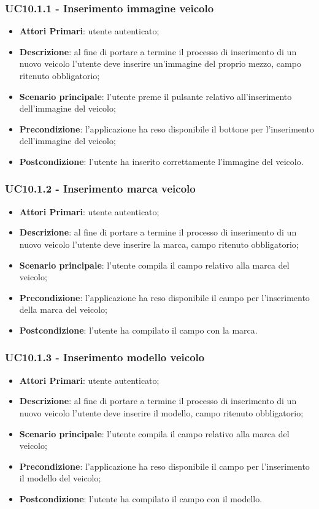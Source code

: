\subsubsection{UC10.1.1 - Inserimento immagine veicolo}
\begin{itemize}
	\item \textbf{Attori Primari}: utente autenticato;
	\item \textbf{Descrizione}: al fine di portare a termine il processo di inserimento di un nuovo veicolo l'utente deve inserire un'immagine del proprio mezzo, campo ritenuto obbligatorio; 
	\item \textbf{Scenario principale}: l'utente preme il pulsante relativo all'inserimento dell'immagine del veicolo;	
	\item \textbf{Precondizione}: l'applicazione ha reso disponibile il bottone per l'inserimento dell'immagine del veicolo;
	\item \textbf{Postcondizione}: l'utente ha inserito correttamente l'immagine del veicolo.
\end{itemize}
\subsubsection{UC10.1.2 - Inserimento marca veicolo}
\begin{itemize}
	\item \textbf{Attori Primari}: utente autenticato;
	\item \textbf{Descrizione}: al fine di portare a termine il processo di inserimento di un nuovo veicolo l'utente deve inserire la marca, campo ritenuto obbligatorio;
	\item \textbf{Scenario principale}: l'utente compila il campo relativo alla marca del veicolo;	
	\item \textbf{Precondizione}: l'applicazione ha reso disponibile il campo per l'inserimento della marca del veicolo;
	\item \textbf{Postcondizione}: l'utente ha compilato il campo con la marca.	
\end{itemize}

\subsubsection{UC10.1.3 - Inserimento modello veicolo}
\begin{itemize}
	\item \textbf{Attori Primari}: utente autenticato;
	\item \textbf{Descrizione}: al fine di portare a termine il processo di inserimento di un nuovo veicolo l'utente deve inserire il modello, campo ritenuto obbligatorio;
	\item \textbf{Scenario principale}: l'utente compila il campo relativo alla marca del veicolo;	
	\item \textbf{Precondizione}: l'applicazione ha reso disponibile il campo per l'inserimento il modello del veicolo;
	\item \textbf{Postcondizione}: l'utente ha compilato il campo con il modello.	
\end{itemize}
